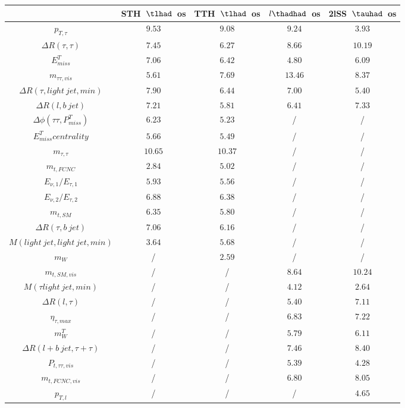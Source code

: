 \centering
\begin{tabular}{|c|c|c|c|c|} \hline
 & STH~$\tlhad$~os & TTH~$\tlhad$~os & $l\thadhad$~os & 2lSS~$\tauhad$~os\\\hline
$p_{T,\tau }$ & $9.53$ & $9.08$ & $9.24$ & $3.93$\\\hline
$\Delta R(\tau ,\tau )$ & $7.45$ & $6.27$ & $8.66$ & $10.19$\\\hline
$E^{T}_{miss}$ & $7.06$ & $6.42$ & $4.80$ & $6.09$\\\hline
$m_{\tau \tau ,vis}$ & $5.61$ & $7.69$ & $13.46$ & $8.37$\\\hline
$\Delta R(\tau ,light~jet,min)$ & $7.90$ & $6.44$ & $7.00$ & $5.40$\\\hline
$\Delta R(l,b~jet)$ & $7.21$ & $5.81$ & $6.41$ & $7.33$\\\hline
$\Delta\phi(\tau \tau ,P^{T}_{miss})$ & $6.23$ & $5.23$ &  / &  /\\\hline
$E^{T}_{miss} centrality$ & $5.66$ & $5.49$ &  / &  /\\\hline
$m_{\tau ,\tau }$ & $10.65$ & $10.37$ &  / &  /\\\hline
$m_{t,FCNC}$ & $2.84$ & $5.02$ &  / &  /\\\hline
$E_{\nu,1}/E_{\tau ,1}$ & $5.93$ & $5.56$ &  / &  /\\\hline
$E_{\nu,2}/E_{\tau ,2}$ & $6.88$ & $6.38$ &  / &  /\\\hline
$m_{t,SM}$ & $6.35$ & $5.80$ &  / &  /\\\hline
$\Delta R(\tau ,b~jet)$ & $7.06$ & $6.16$ &  / &  /\\\hline
$M(light~jet,light~jet,min)$ & $3.64$ & $5.68$ &  / &  /\\\hline
$m_{W}$ &  / & $2.59$ &  / &  /\\\hline
$m_{t,SM,vis}$ &  / &  / & $8.64$ & $10.24$\\\hline
$M(\tau  light~jet,min)$ &  / &  / & $4.12$ & $2.64$\\\hline
$\Delta R(l,\tau )$ &  / &  / & $5.40$ & $7.11$\\\hline
$\eta_{\tau ,max}$ &  / &  / & $6.83$ & $7.22$\\\hline
$m^{T}_{W}$ &  / &  / & $5.79$ & $6.11$\\\hline
$\Delta R(l+b~jet,\tau +\tau )$ &  / &  / & $7.46$ & $8.40$\\\hline
$P_{t,\tau \tau ,vis}$ &  / &  / & $5.39$ & $4.28$\\\hline
$m_{t,FCNC,vis}$ &  / &  / & $6.80$ & $8.05$\\\hline
$p_{T,l}$ &  / &  / &  / & $4.65$\\\hline
\end{tabular}
